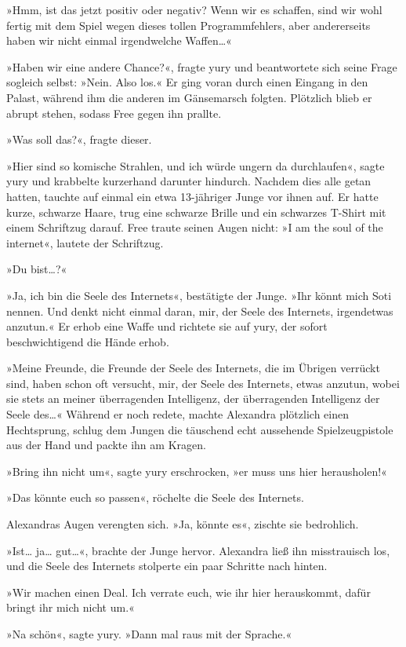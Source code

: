 »Hmm, ist das jetzt positiv oder negativ? Wenn wir es schaffen, sind wir wohl fertig mit dem Spiel wegen dieses tollen Programmfehlers, aber andererseits haben wir nicht einmal irgendwelche Waffen…«

»Haben wir eine andere Chance?«, fragte yury und beantwortete sich seine Frage sogleich selbst: »Nein. Also los.« Er ging voran durch einen Eingang in den Palast, während ihm die anderen im Gänsemarsch folgten. Plötzlich blieb er abrupt stehen, sodass Free gegen ihn prallte.

»Was soll das?«, fragte dieser.

»Hier sind so komische Strahlen, und ich würde ungern da durchlaufen«, sagte yury und krabbelte kurzerhand darunter hindurch. Nachdem dies alle getan hatten, tauchte auf einmal ein etwa 13-jähriger Junge vor ihnen auf. Er hatte kurze, schwarze Haare, trug eine schwarze Brille und ein schwarzes T-Shirt mit einem Schriftzug darauf. Free traute seinen Augen nicht: »I am the soul of the internet«, lautete der Schriftzug.

»Du bist…?«

»Ja, ich bin die Seele des Internets«, bestätigte der Junge. »Ihr könnt mich Soti nennen. Und denkt nicht einmal daran, mir, der Seele des Internets, irgendetwas anzutun.« Er erhob eine Waffe und richtete sie auf yury, der sofort beschwichtigend die Hände erhob.

»Meine Freunde, die Freunde der Seele des Internets, die im Übrigen verrückt sind, haben schon oft versucht, mir, der Seele des Internets, etwas anzutun, wobei sie stets an meiner überragenden Intelligenz, der überragenden Intelligenz der Seele des…« Während er noch redete, machte Alexandra plötzlich einen Hechtsprung, schlug dem Jungen die täuschend echt aussehende Spielzeugpistole aus der Hand und packte ihn am Kragen.

»Bring ihn nicht um«, sagte yury erschrocken, »er muss uns hier herausholen!«

»Das könnte euch so passen«, röchelte die Seele des Internets.

Alexandras Augen verengten sich. »Ja, könnte es«, zischte sie bedrohlich.

»Ist… ja… gut…«, brachte der Junge hervor. Alexandra ließ ihn misstrauisch los, und die Seele des Internets stolperte ein paar Schritte nach hinten.

»Wir machen einen Deal. Ich verrate euch, wie ihr hier herauskommt, dafür bringt ihr mich nicht um.«

»Na schön«, sagte yury. »Dann mal raus mit der Sprache.«

